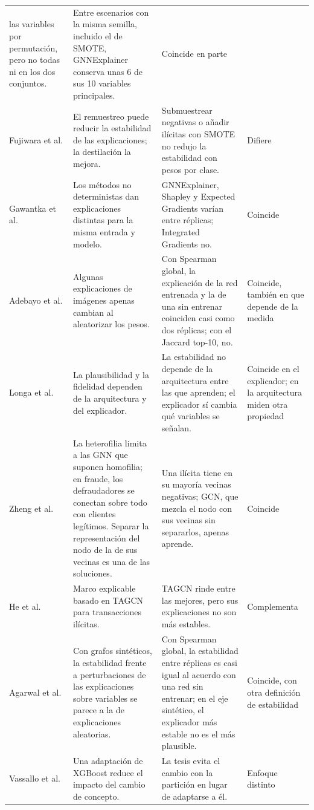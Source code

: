 \begin{table}[ht]
\begin{tabularx}{\textwidth}{p{}XXp{}}
las variables por permutación, pero no todas ni en los dos conjuntos. &
Entre escenarios con la misma semilla, incluido el de SMOTE, GNNExplainer conserva unas 6 de sus
10 variables principales. & Coincide en parte \\
Fujiwara et al. \cite{Fujiwara2024Stability} &
El remuestreo puede reducir la estabilidad de las explicaciones; la destilación la mejora. &
Submuestrear negativas o añadir ilícitas con SMOTE no redujo la estabilidad con pesos por clase.
& Difiere \\
Gawantka et al. \cite{Gawantka2024Explanations} &
Los métodos no deterministas dan explicaciones distintas para la misma entrada y modelo. &
GNNExplainer, Shapley y Expected Gradients varían entre réplicas; Integrated Gradients no. &
Coincide \\
Adebayo et al. \cite{Adebayo2018Sanity} &
Algunas explicaciones de imágenes apenas cambian al aleatorizar los pesos. &
Con Spearman global, la explicación de la red entrenada y la de una sin entrenar coinciden casi
como dos réplicas; con el Jaccard top-10, no. & Coincide, también en que depende de la medida \\
Longa et al. \cite{Longa2024Explaining} &
La plausibilidad y la fidelidad dependen de la arquitectura y del explicador. &
La estabilidad no depende de la arquitectura entre las que aprenden; el explicador sí cambia
qué variables se señalan. & Coincide en el explicador; en la arquitectura miden otra propiedad \\
Zheng et al. \cite{Zheng2026Heterophily} &
La heterofilia limita a las GNN que suponen homofilia; en fraude, los defraudadores se conectan
sobre todo con clientes legítimos. Separar la representación del nodo de la de sus vecinas es
una de las soluciones. &
Una ilícita tiene en su mayoría vecinas negativas; GCN, que mezcla el nodo con sus vecinas
sin separarlos, apenas aprende. & Coincide \\
He et al. \cite{He2026Detection} &
Marco explicable basado en TAGCN para transacciones ilícitas. &
TAGCN rinde entre las mejores, pero sus explicaciones no son más estables. & Complementa \\
Agarwal et al. \cite{Agarwal2023Evaluating} &
Con grafos sintéticos, la estabilidad frente a perturbaciones de las explicaciones sobre
variables se parece a la de explicaciones aleatorias. &
Con Spearman global, la estabilidad entre réplicas es casi igual al acuerdo con una red sin
entrenar; en el eje sintético, el explicador más estable no es el más plausible. & Coincide, con
otra definición de estabilidad \\
Vassallo et al. \cite{Vassallo2021Boosting} &
Una adaptación de XGBoost reduce el impacto del cambio de concepto. &
La tesis evita el cambio con la partición en lugar de adaptarse a él. & Enfoque distinto \\
\bottomrule
\end{tabularx}
\end{table}

